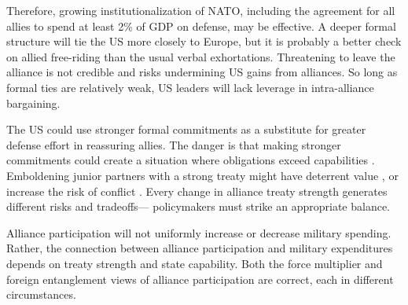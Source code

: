 \documentclass[12pt]{article}
\begin{document}
 
Therefore, growing institutionalization of NATO, including the agreement for all allies to spend at least 2\% of GDP on defense, may be effective.
A deeper formal structure will tie the US more closely to Europe, but it is probably a better check on allied free-riding than the usual verbal exhortations. 
Threatening to leave the alliance is not credible and risks undermining US gains from alliances. 
So long as formal ties are relatively weak, US leaders will lack leverage in intra-alliance bargaining. 


The US could use stronger formal commitments as a substitute for greater defense effort in reassuring allies.
The danger is that making stronger commitments could create a situation where obligations exceed capabilities \citep{Kennedy1987}. 
Emboldening junior partners with a strong treaty might have deterrent value \citep{Bensonetal2014}, or increase the risk of conflict \citep{Benson2012}.
Every change in alliance treaty strength generates different risks and tradeoffs--- policymakers must strike an appropriate balance. 
 

Alliance participation will not uniformly increase or decrease military spending. 
Rather, the connection between alliance participation and military expenditures depends on treaty strength and state capability.  
Both the force multiplier and foreign entanglement views of alliance participation are correct, each in different circumstances. 




\singlespace
 
 
\end{document}
